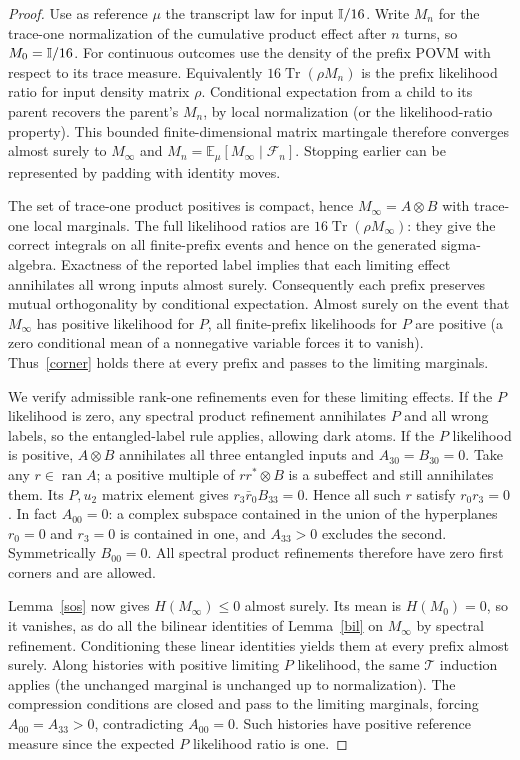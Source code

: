 \documentclass[11pt]{article}
\newcommand{\Tr}{\operatorname{Tr}}\newcommand{\Ree}{\operatorname{Re}}\newcommand{\C}{\mathbb C}
\begin{document}
\begin{proof}
Use as reference $\mu$ the transcript law for input $\mathbb I/16$. Write $M_n$ for the trace-one normalization of the cumulative product effect after $n$ turns, so $M_0=\mathbb I/16$. For continuous outcomes use the density of the prefix POVM with respect to its trace measure. Equivalently $16\Tr(\rho M_n)$ is the prefix likelihood ratio for input density matrix $\rho$. Conditional expectation from a child to its parent recovers the parent's $M_n$, by local normalization (or the likelihood-ratio property). This bounded finite-dimensional matrix martingale therefore converges almost surely to $M_\infty$ and $M_n=\mathbb E_\mu[M_\infty\mid\mathcal F_n]$. Stopping earlier can be represented by padding with identity moves.

The set of trace-one product positives is compact, hence $M_\infty=A\otimes B$ with trace-one local marginals. The full likelihood ratios are $16\Tr(\rho M_\infty)$: they give the correct integrals on all finite-prefix events and hence on the generated sigma-algebra. Exactness of the reported label implies that each limiting effect annihilates all wrong inputs almost surely. Consequently each prefix preserves mutual orthogonality by conditional expectation. Almost surely on the event that $M_\infty$ has positive likelihood for $P$, all finite-prefix likelihoods for $P$ are positive (a zero conditional mean of a nonnegative variable forces it to vanish). Thus~\eqref{corner} holds there at every prefix and passes to the limiting marginals.

We verify admissible rank-one refinements even for these limiting effects. If the $P$ likelihood is zero, any spectral product refinement annihilates $P$ and all wrong labels, so the entangled-label rule applies, allowing dark atoms. If the $P$ likelihood is positive, $A\otimes B$ annihilates all three entangled inputs and $A_{30}=B_{30}=0$. Take any $r\in\operatorname{ran} A$; a positive multiple of $rr^*\otimes B$ is a subeffect and still annihilates them. Its $P,u_2$ matrix element gives $r_3\bar r_0 B_{33}=0$. Hence all such $r$ satisfy $r_0r_3=0$. In fact $A_{00}=0$: a complex subspace contained in the union of the hyperplanes $r_0=0$ and $r_3=0$ is contained in one, and $A_{33}>0$ excludes the second. Symmetrically $B_{00}=0$. All spectral product refinements therefore have zero first corners and are allowed.

Lemma~\ref{sos} now gives $H(M_\infty)\le0$ almost surely. Its mean is $H(M_0)=0$, so it vanishes, as do all the bilinear identities of Lemma~\ref{bil} on $M_\infty$ by spectral refinement. Conditioning these linear identities yields them at every prefix almost surely. Along histories with positive limiting $P$ likelihood, the same $\mathcal T$ induction applies (the unchanged marginal is unchanged up to normalization). The compression conditions are closed and pass to the limiting marginals, forcing $A_{00}=A_{33}>0$, contradicting $A_{00}=0$. Such histories have positive reference measure since the expected $P$ likelihood ratio is one.
\end{proof}
\end{document}
